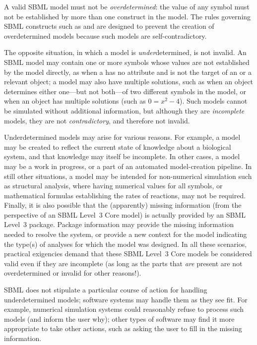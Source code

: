 A valid SBML model must not be \emph{overdetermined}: the value of any symbol must not be established by more than one construct in the model.  The rules governing SBML constructs such as \InitialAssignment and \Rule are designed to prevent the creation of overdetermined models because such models are self-contradictory.

The opposite situation, in which a model is \emph{under}determined, is not invalid.  An SBML model may contain one or more symbols whose values are not established by the model directly, as when a \Parameter has no  attribute and is not the target of an \InitialAssignment or a relevant \Rule object; a model may also have multiple solutions, such as when an \AlgebraicRule object determines either one---but not both---of two different symbols in the model, or when an \AlgebraicRule object has multiple solutions (such as $0=x^2-4$).  Such models cannot be simulated without additional information, but although they are \emph{incomplete} models, they are not \emph{contradictory}, and therefore not invalid.

Underdetermined models may arise for various reasons.  For example, a model may be created to reflect the current state of knowledge about a biological system, and that knowledge may itself be incomplete.  In other cases, a model may be a work in progress, or a part of an automated model-creation pipeline.  In still other situations, a model may be intended for non-numerical simulation such as structural analysis, where having numerical values for all symbols, or mathematical formulas establishing the rates of reactions, may not be required.  Finally, it is also possible that the (apparently) missing information (from the perspective of an SBML Level~3 Core model) is actually provided by an SBML Level~3 package.  Package information may provide the missing information needed to resolve the system, or provide a new context for the model indicating the type(s) of analyses for which the model was designed.  In all these scenarios, practical exigencies demand that these SBML Level~3 Core models be considered valid even if they are incomplete (as long as the parts that \emph{are} present are not overdetermined or invalid for other reasons!).

SBML \thisLV does not stipulate a particular course of action for handling underdetermined models; software systems may handle them as they see fit.  For example, numerical simulation systems could reasonably refuse to process such models (and inform the user why); other types of software may find it more appropriate to take other actions, such as asking the user to fill in the missing information.

